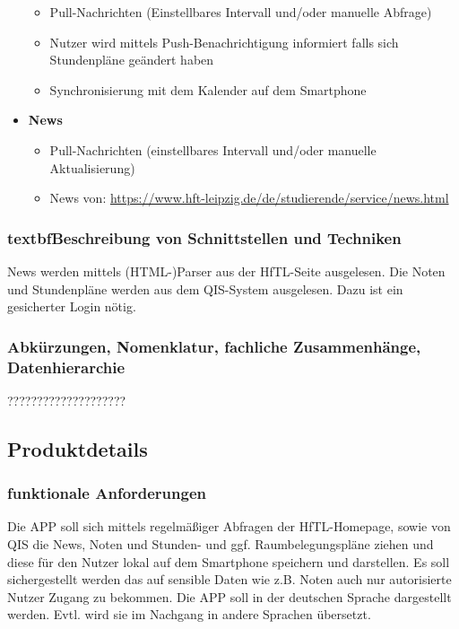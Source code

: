 \begin{itemize}
\begin{itemize}
				\item Pull-Nachrichten (Einstellbares Intervall und/oder manuelle Abfrage)
				\item Nutzer wird mittels Push-Benachrichtigung informiert falls sich Stundenpläne geändert haben
				\item Synchronisierung mit dem Kalender auf dem Smartphone
			\end{itemize}
		\item \textbf{News}
			\begin{itemize}
				\item Pull-Nachrichten (einstellbares Intervall und/oder manuelle Aktualisierung)
				\item News von: \url{https://www.hft-leipzig.de/de/studierende/service/news.html} 
			\end{itemize}
\end{itemize}				

\subsubsection{textbf{Beschreibung von Schnittstellen und Techniken}}

News werden mittels (HTML-)Parser aus der HfTL-Seite ausgelesen. Die Noten und Stundenpläne werden aus dem QIS-System ausgelesen. Dazu ist ein gesicherter Login nötig.


\subsubsection{\textbf{Abkürzungen, Nomenklatur, fachliche Zusammenhänge, Datenhierarchie}}
????????????????????

\subsection{Produktdetails}

\subsubsection{\textbf{funktionale Anforderungen}}

Die APP soll sich mittels regelmäßiger Abfragen der HfTL-Homepage, sowie von QIS die News, Noten und Stunden- und ggf. Raumbelegungspläne ziehen und diese für den Nutzer lokal auf dem Smartphone speichern und darstellen. Es soll sichergestellt werden das auf sensible Daten wie z.B. Noten auch nur autorisierte Nutzer Zugang zu bekommen. Die APP soll in der deutschen Sprache dargestellt werden. Evtl. wird sie im Nachgang in andere Sprachen übersetzt. 


